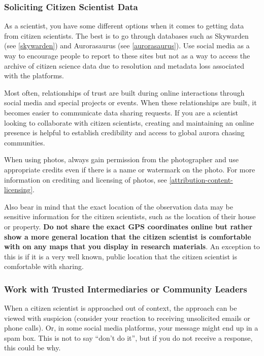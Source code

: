 \documentclass{article}
\newcommand{\contributed}[1]{%
    \par\noindent
    \begingroup
    \setlength{\leftskip}{1em}%
    \itshape
    Contributors: #1
    \par
    \endgroup
    \vspace{0.5em}
}
\begin{document}
\subsubsection{Soliciting Citizen Scientist Data}

As a scientist, you have some different options when it comes to getting data from citizen scientists. The best is to go through databases such as Skywarden (see \ref{skywarden}) and Aurorasaurus (see  \ref{aurorasaurus}).
Use social media as a way to encourage people to report to these sites but not as a way to access the archive of citizen science data due to resolution and metadata loss associated with the platforms. 

Most often, relationships of trust are built during online interactions through social media and special projects or events.  When these relationships are built, it becomes easier to communicate data sharing requests.  If you are a scientist looking to collaborate with citizen scientists, creating and maintaining an online presence is helpful to establish credibility and access to global aurora chasing communities.

When using photos, always gain permission from the photographer and use appropriate credits even if there is a name or watermark on the photo. For more information on crediting and licensing of photos, see \ref{attribution-content-licensing}.

Also bear in mind that the exact location of the observation data may be sensitive information for the citizen scientists, such as the location of their house or property. \textbf{Do not share the exact GPS coordinates online but rather show a more general location that the citizen scientist is comfortable with on any maps that you display in research materials}. An exception to this is if it is a very well known, public location that the citizen scientist is comfortable with sharing.

\subsubsection{Work with Trusted Intermediaries or Community Leaders}
When a citizen scientist is approached out of context, the approach can be viewed with suspicion (consider your reaction to receiving unsolicited emails or phone calls). Or, in some social media platforms, your message might end up in a spam box. This is not to say ``don't do it'', but if you do not receive a response, this could be why.
\end{document}
